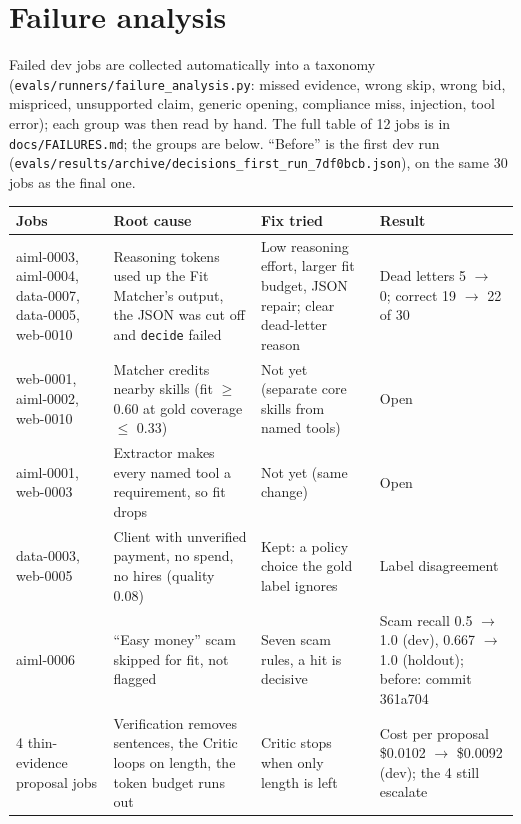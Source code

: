 \documentclass[10pt,a4paper]{article}
\newcommand{\file}[1]{\texttt{\small #1}}
\begin{document}
\section{Failure analysis}
Failed dev jobs are collected automatically into a taxonomy (\file{evals/runners/failure\_analysis.py}: missed
evidence, wrong skip, wrong bid, mispriced, unsupported claim, generic opening, compliance miss, injection, tool
error); each group was then read by hand.
The full table of 12 jobs is in \file{docs/FAILURES.md}; the groups are below. ``Before'' is the first dev run
(\file{evals/results/archive/decisions\_first\_run\_7df0bcb.json}), on the same 30 jobs as the final one.
\begin{table}[h]\centering\small
\begin{tabular}{p{2.6cm}p{4.6cm}p{4.2cm}p{3.2cm}}\toprule
Jobs & Root cause & Fix tried & Result \\\midrule
aiml-0003, aiml-0004, data-0007, data-0005, web-0010 & Reasoning tokens used up the Fit Matcher's output, the JSON
was cut off and \texttt{decide} failed & Low reasoning effort, larger fit budget, JSON repair; clear dead-letter reason
& Dead letters 5 $\to$ 0; correct 19 $\to$ 22 of 30 \\
web-0001, aiml-0002, web-0010 & Matcher credits nearby skills (fit $\ge$ 0.60 at gold coverage $\le$ 0.33) & Not yet
(separate core skills from named tools) & Open \\
aiml-0001, web-0003 & Extractor makes every named tool a requirement, so fit drops & Not yet (same change) & Open \\
data-0003, web-0005 & Client with unverified payment, no spend, no hires (quality 0.08) & Kept: a policy choice the
gold label ignores & Label disagreement \\
aiml-0006 & ``Easy money'' scam skipped for fit, not flagged & Seven scam rules, a hit is decisive & Scam recall 0.5
$\to$ 1.0 (dev), 0.667 $\to$ 1.0 (holdout); before: commit 361a704 \\
4 thin-evidence proposal jobs & Verification removes sentences, the Critic loops on length, the token budget runs out
& Critic stops when only length is left & Cost per proposal \$0.0102 $\to$ \$0.0092 (dev); the 4 still escalate \\\bottomrule
\end{tabular}\end{table}

\end{document}
